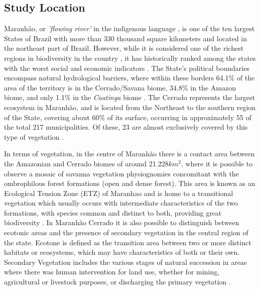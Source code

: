 \subsection{Study Location} %


Maranhão, or \textit{'flowing river'} in the indigenous language \citep{girardi_2015}, is one of the ten largest States of Brazil with more than 330 thousand square kilometers and located in the northeast part of Brazil. However, while it is considered one of the richest regions in biodiversity in the country \citep{BATISTELLA_2014}, it has historically ranked among the states with the worst social and economic indicators \citep{CELENTANO_2017}.  The State's political boundaries encompass natural hydrological barriers, where within these borders 64.1\% of the area of the territory is in the Cerrado/Savana biome, 34.8\% in the Amazon biome, and only 1.1\% in the \textit{Caatinga} biome \citep{STELLA_2011}. The Cerrado represents the largest ecosystem in Maranhão, and is located from the Northeast to the southern region of the State, covering about 60\% of its surface, occurring in approximately 55 of the total 217 municipalities. Of these, 23 are almost exclusively covered by this type of vegetation \citep{BATISTELLA_2013}. 

In terms of vegetation, in the centre of Maranhão there is a contact area between the Amazonian and Cerrado biomes of around 21.228$km^2$, where it is possible to observe a mosaic of savanna vegetation physiognomies concomitant with the ombrophilous forest formations (open and dense forest). This area is known as an Ecological Tension Zone (ETZ) of Maranhao and is home to a transitional vegetation which usually occurs with intermediate characteristics of the two formations, with species common and distinct to both, providing great biodiversity \citep{rossatto_2013}. In Maranhão Cerrado it is also possible to distinguish between ecotonic areas and the presence of secondary vegetation in the central region of the state. Ecotone is defined as the transition area between two or more distinct habitats or ecosystems, which may have characteristics of both or their own. Secondary Vegetation includes the various stages of natural succession in areas where there was human intervention for land use, whether for mining, agricultural or livestock purposes, or discharging the primary vegetation \citep{SANTOS-FILHO_2013}. 

